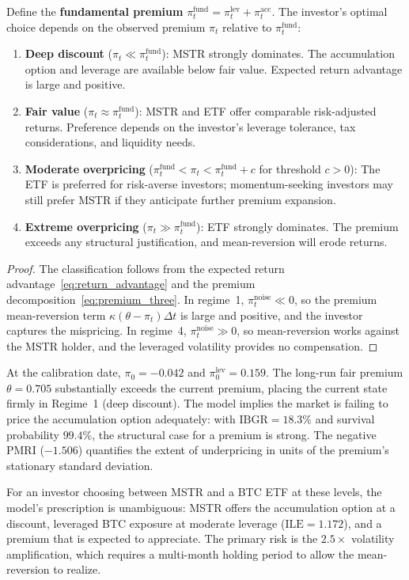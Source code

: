 \begin{proposition}
\label{prop:regime_map}
Define the \textbf{fundamental premium} $\pi_t^{\mathrm{fund}} = \pi_t^{\mathrm{lev}} + \pi_t^{\mathrm{acc}}$. The investor's optimal choice depends on the observed premium $\pi_t$ relative to $\pi_t^{\mathrm{fund}}$:
\begin{enumerate}
  \item \textbf{Deep discount} ($\pi_t \ll \pi_t^{\mathrm{fund}}$): MSTR strongly dominates. The accumulation option and leverage are available below fair value. Expected return advantage is large and positive.
  \item \textbf{Fair value} ($\pi_t \approx \pi_t^{\mathrm{fund}}$): MSTR and ETF offer comparable risk-adjusted returns. Preference depends on the investor's leverage tolerance, tax considerations, and liquidity needs.
  \item \textbf{Moderate overpricing} ($\pi_t^{\mathrm{fund}} < \pi_t < \pi_t^{\mathrm{fund}} + c$ for threshold $c > 0$): The ETF is preferred for risk-averse investors; momentum-seeking investors may still prefer MSTR if they anticipate further premium expansion.
  \item \textbf{Extreme overpricing} ($\pi_t \gg \pi_t^{\mathrm{fund}}$): ETF strongly dominates. The premium exceeds any structural justification, and mean-reversion will erode returns.
\end{enumerate}
\end{proposition}

\begin{proof}
The classification follows from the expected return advantage~\eqref{eq:return_advantage} and the premium decomposition~\eqref{eq:premium_three}. In regime~1, $\pi_t^{\mathrm{noise}} \ll 0$, so the premium mean-reversion term $\kappa(\theta - \pi_t)\Delta t$ is large and positive, and the investor captures the mispricing. In regime~4, $\pi_t^{\mathrm{noise}} \gg 0$, so mean-reversion works against the MSTR holder, and the leveraged volatility provides no compensation.
\end{proof}

\begin{remark}
\label{rem:current_regime}
At the calibration date, $\pi_0 = -0.042$ and $\pi_0^{\mathrm{lev}} = 0.159$. The long-run fair premium $\theta = 0.705$ substantially exceeds the current premium, placing the current state firmly in Regime~1 (deep discount). The model implies the market is failing to price the accumulation option adequately: with $\mathrm{IBGR} = 18.3\%$ and survival probability $99.4\%$, the structural case for a premium is strong. The negative PMRI ($-1.506$) quantifies the extent of underpricing in units of the premium's stationary standard deviation.

For an investor choosing between MSTR and a BTC ETF at these levels, the model's prescription is unambiguous: MSTR offers the accumulation option at a discount, leveraged BTC exposure at moderate leverage ($\mathrm{ILE} = 1.172$), and a premium that is expected to appreciate. The primary risk is the $2.5\times$ volatility amplification, which requires a multi-month holding period to allow the mean-reversion to realize.
\end{remark}
